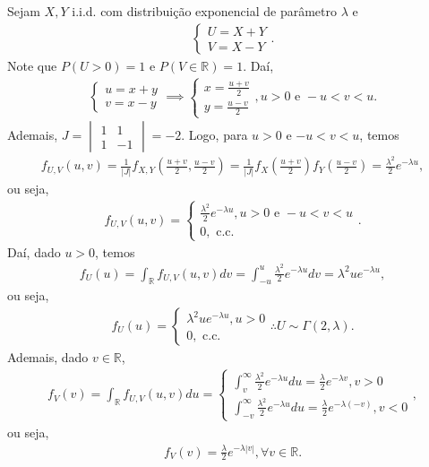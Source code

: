 \documentclass[../Notas.tex]{subfiles}
\begin{document}
\begin{example}
Sejam $X,Y$ i.i.d. com distribuição exponencial de parâmetro $\lambda$ e 
\begin{align*}
    \begin{cases}
    U = X+Y \\
    V = X-Y
    \end{cases}.
\end{align*}
Note que $P(U>0) = 1$ e $P(V\in\mathbb{R}) = 1$. Daí,
\begin{align*}
    \begin{cases}
    u = x+y \\
    v = x-y
    \end{cases} \implies 
    \begin{cases}
    x = \frac{u+v}{2} \\
    y = \frac{u-v}{2}
    \end{cases}, u > 0 \text{ e } -u < v < u.
\end{align*}
Ademais, $\displaystyle{ J = \begin{vmatrix} 1 & 1 \\
1 & -1 \end{vmatrix} = -2}$. Logo, para $u>0$ e $-u < v < u$, temos
\begin{align*}
    f_{U,V}(u,v) = \frac{1}{|J|}f_{X,Y}\left(\frac{u+v}{2}, \frac{u-v}{2} \right) = \frac{1}{|J|}f_X\left(\frac{u+v}{2}\right)f_Y\left(\frac{u-v}{2}\right) = \frac{\lambda^2}{2}e^{-\lambda u},
\end{align*}
ou seja,
\begin{align*}
    f_{U,V}(u,v) = \begin{cases}
    \frac{\lambda^2}{2}e^{-\lambda u}, u > 0 \text{ e } -u < v < u \\
    0, \text{ c.c.}
    \end{cases}.
\end{align*}
Daí, dado $u>0$, temos
\begin{align*}
    f_U(u) = \int_{\mathbb{R}} f_{U,V}(u,v) dv = \int_{-u}^{u} \frac{\lambda^2}{2}e^{-\lambda u} dv = \lambda^2 ue^{-\lambda u},
\end{align*}
ou seja,
\begin{align*}
    f_U(u) = \begin{cases}
    \lambda^2 ue^{-\lambda u}, u > 0 \\
    0, \text{ c.c.}
    \end{cases} \therefore U\sim\Gamma(2, \lambda).
\end{align*}
Ademais, dado $v\in\mathbb{R}$,
\begin{align*}
    f_V(v) = \int_{\mathbb{R}} f_{U,V}(u,v) du = \begin{cases}
    \int_{v}^{\infty} \frac{\lambda^2}{2} e^{-\lambda u} du = \frac{\lambda}{2}e^{-\lambda v}, v > 0 \\
    \int_{-v}^{\infty} \frac{\lambda^2}{2} e^{-\lambda u} du = \frac{\lambda}{2}e^{-\lambda (-v)}, v < 0
    \end{cases},
\end{align*}
ou seja,
\begin{align*}
    f_V(v) = \frac{\lambda}{2}e^{-\lambda |v|}, \forall v\in\mathbb{R}.
\end{align*}
\end{example}
\end{document}

